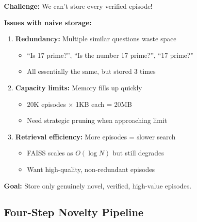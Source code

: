 \documentclass[12pt,a4paper]{article}
\theoremstyle{definition}
\begin{document}
\begin{problembox}
\textbf{Challenge:} We can't store every verified episode!

\textbf{Issues with naive storage:}
\begin{enumerate}
    \item \textbf{Redundancy:} Multiple similar questions waste space
    \begin{itemize}
        \item ``Is 17 prime?'', ``Is the number 17 prime?'', ``17 prime?''
        \item All essentially the same, but stored 3 times
    \end{itemize}
    
    \item \textbf{Capacity limits:} Memory fills up quickly
    \begin{itemize}
        \item 20K episodes $\times$ 1KB each = 20MB
        \item Need strategic pruning when approaching limit
    \end{itemize}
    
    \item \textbf{Retrieval efficiency:} More episodes = slower search
    \begin{itemize}
        \item FAISS scales as $O(\log N)$ but still degrades
        \item Want high-quality, non-redundant episodes
    \end{itemize}
\end{enumerate}

\textbf{Goal:} Store only genuinely novel, verified, high-value episodes.
\end{problembox}

\subsection{Four-Step Novelty Pipeline}
\end{document}
